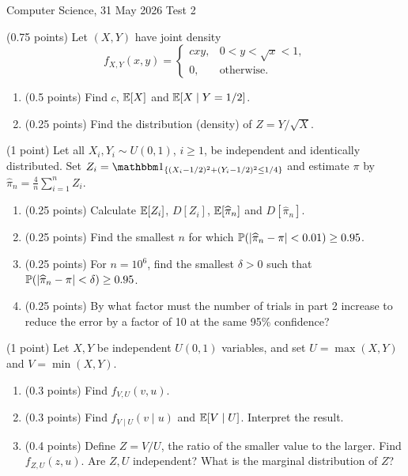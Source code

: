 \documentclass[a4paper]{report}
\begin{document}
\noindent Computer Science, 31 May 2026 \hfill Test 2
\vspace{0.5cm}
\begin{problem} (0.75 points)
Let $(X,Y)$ have joint density
\[f_{X,Y}(x,y)=\begin{cases}cxy,&0<y<\sqrt x<1,\\0,&\text{otherwise.}\end{cases}\]
\begin{enumerate}
\item (0.5 points) Find $c$, $\E[X]$ and $\E[X\mid Y=1/2]$.
\item (0.25 points) Find the distribution (density) of $Z=Y/\sqrt X$.
\end{enumerate}
\end{problem}
\begin{problem} (1 point)
Let all $X_i,Y_i\sim U(0,1)$, $i\geq1$, be independent and identically distributed. Set $Z_i=\mathbbm1_{\{(X_i-1/2)^2+(Y_i-1/2)^2\leq1/4\}}$ and estimate $\pi$ by $\widehat\pi_n=\frac4n\sum_{i=1}^nZ_i$.
\begin{enumerate}
\item (0.25 points) Calculate $\E[Z_i]$, $D[Z_i]$, $\E[\widehat\pi_n]$ and $D[\widehat\pi_n]$.
\item (0.25 points) Find the smallest $n$ for which $\P(|\widehat\pi_n-\pi|<0.01)\geq0.95$.
\item (0.25 points) For $n=10^6$, find the smallest $\delta>0$ such that $\P(|\widehat\pi_n-\pi|<\delta)\geq0.95$.
\item (0.25 points) By what factor must the number of trials in part 2 increase to reduce the error by a factor of 10 at the same 95\% confidence?
\end{enumerate}
\end{problem}
\begin{problem} (1 point)
Let $X,Y$ be independent $U(0,1)$ variables, and set $U=\max(X,Y)$ and $V=\min(X,Y)$.
\begin{enumerate}
\item (0.3 points) Find $f_{V,U}(v,u)$.
\item (0.3 points) Find $f_{V\mid U}(v\mid u)$ and $\E[V\mid U]$. Interpret the result.
\item (0.4 points) Define $Z=V/U$, the ratio of the smaller value to the larger. Find $f_{Z,U}(z,u)$. Are $Z,U$ independent? What is the marginal distribution of $Z$?
\end{enumerate}
\end{problem}
\end{document}
